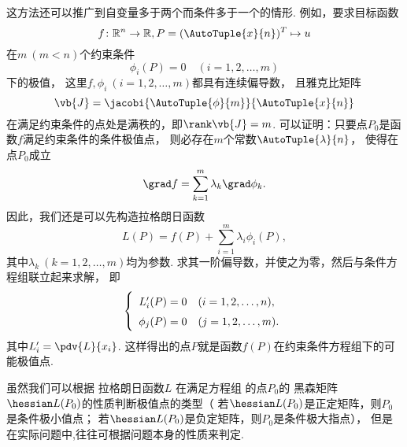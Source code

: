 这方法还可以推广到自变量多于两个而条件多于一个的情形.
例如，要求目标函数\begin{equation*}
	f\colon \mathbb{R}^n \to \mathbb{R}, P = (\AutoTuple{x}{n})^T \mapsto u
\end{equation*}在\(m\ (m<n)\)个约束条件\begin{equation*}
	\phi_i(P) = 0
	\quad(i=1,2,\dotsc,m)
\end{equation*}下的极值，
这里\(f,\phi_i\ (i=1,2,\dotsc,m)\)都具有连续偏导数，
且雅克比矩阵\begin{equation*}
	\vb{J} = \jacobi{\AutoTuple{\phi}{m}}{\AutoTuple{x}{n}}
\end{equation*}在满足约束条件的点处是满秩的，即\(\rank\vb{J} = m\).
可以证明：只要点\(P_0\)是函数\(f\)满足约束条件的条件极值点，
则必存在\(m\)个常数\(\AutoTuple{\lambda}{n}\)，
使得在点\(P_0\)成立\begin{equation}
	\grad f = \sum_{k=1}^m \lambda_k \grad \phi_k.
\end{equation}
因此，我们还是可以先构造拉格朗日函数\begin{equation}
	L(P) = f(P) + \sum_{i=1}^m \lambda_i \phi_i(P),
\end{equation}
其中\(\lambda_k\ (k=1,2,\dotsc,m)\)均为参数.
求其一阶偏导数，并使之为零，然后与条件方程组联立起来求解，
即\begin{equation}\label{equation:拉格朗日乘数法.可能极值点方程}
	\left\{ \def\arraystretch{1.5} \begin{array}{ll}
		L'_i(P) = 0 & (i=1,2,\dotsc,n), \\
		\phi_j(P) = 0 & (j=1,2,\dotsc,m).
	\end{array} \right.
\end{equation}
其中\(L'_i = \pdv{L}{x_i}\).
这样得出的点\(P\)就是函数\(f(P)\)在约束条件方程组下的可能极值点.

虽然我们可以根据
拉格朗日函数\(L\)
在满足方程组  的点\(P_0\)的
黑森矩阵\(\hessian L(P_0)\)的性质判断极值点的类型（
若\(\hessian L(P_0)\)是正定矩阵，则\(P_0\)是条件极小值点；
若\(\hessian L(P_0)\)是负定矩阵，则\(P_0\)是条件极大指点），
但是在实际问题中,往往可根据问题本身的性质来判定.


